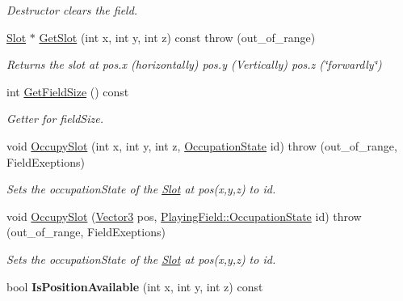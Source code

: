 \begin{DoxyCompactItemize}
\begin{DoxyCompactList}\small\item\em Destructor clears the field. \end{DoxyCompactList}\item 
\hyperlink{structPlayingField_1_1Slot}{Slot} $\ast$ \hyperlink{classPlayingField_a01b5105b49ec72e094411d216df27ffa}{Get\-Slot} (int x, int y, int z) const   throw (out\-\_\-of\-\_\-range)
\begin{DoxyCompactList}\small\item\em Returns the slot at pos.\-x (horizontally) pos.\-y (Vertically) pos.\-z (\char`\"{}forwardly\char`\"{}) \end{DoxyCompactList}\item 
int \hyperlink{classPlayingField_abfbecf0f8ba91c9c1167da359e7463dc}{Get\-Field\-Size} () const 
\begin{DoxyCompactList}\small\item\em Getter for field\-Size. \end{DoxyCompactList}\item 
void \hyperlink{classPlayingField_a166ff0aaa90a41ce748efd9165a9d578}{Occupy\-Slot} (int x, int y, int z, \hyperlink{classPlayingField_ac6df152a3f820aa04a00ab4df4a9d265}{Occupation\-State} id)  throw (out\-\_\-of\-\_\-range, Field\-Exeptions)
\begin{DoxyCompactList}\small\item\em Sets the occupation\-State of the \hyperlink{structPlayingField_1_1Slot}{Slot} at pos(x,y,z) to id. \end{DoxyCompactList}\item 
void \hyperlink{classPlayingField_a6165557999a6cec6c1c1b71b88c2f82e}{Occupy\-Slot} (\hyperlink{structVector3}{Vector3} pos, \hyperlink{classPlayingField_ac6df152a3f820aa04a00ab4df4a9d265}{Playing\-Field\-::\-Occupation\-State} id)  throw (out\-\_\-of\-\_\-range, Field\-Exeptions)
\begin{DoxyCompactList}\small\item\em Sets the occupation\-State of the \hyperlink{structPlayingField_1_1Slot}{Slot} at pos(x,y,z) to id. \end{DoxyCompactList}\item 
\hypertarget{classPlayingField_af25e735d1d9f1c561fdf951507b2c1de}{bool {\bfseries Is\-Position\-Available} (int x, int y, int z) const }\label{classPlayingField_af25e735d1d9f1c561fdf951507b2c1de}

\end{DoxyCompactItemize}
